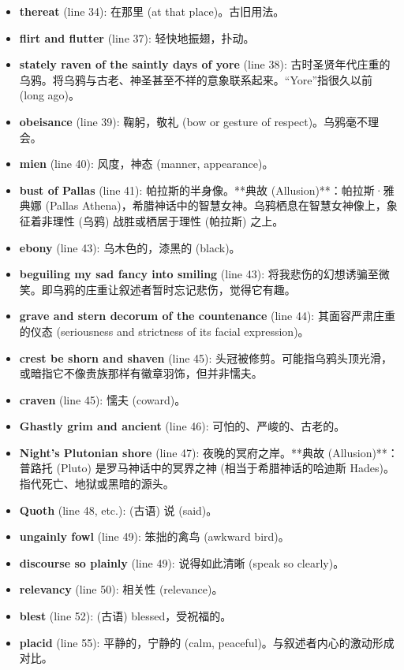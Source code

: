 \documentclass[12pt, a4paper]{article}
\begin{document}
\begin{itemize}
    \item \textbf{thereat} (line 34): 在那里 (at that place)。古旧用法。
    \item \textbf{flirt and flutter} (line 37): 轻快地振翅，扑动。
    \item \textbf{stately raven of the saintly days of yore} (line 38): 古时圣贤年代庄重的乌鸦。将乌鸦与古老、神圣甚至不祥的意象联系起来。“Yore”指很久以前 (long ago)。
    \item \textbf{obeisance} (line 39): 鞠躬，敬礼 (bow or gesture of respect)。乌鸦毫不理会。
    \item \textbf{mien} (line 40): 风度，神态 (manner, appearance)。
    \item \textbf{bust of Pallas} (line 41): 帕拉斯的半身像。**典故 (Allusion)**：帕拉斯·雅典娜 (Pallas Athena)，希腊神话中的智慧女神。乌鸦栖息在智慧女神像上，象征着非理性 (乌鸦) 战胜或栖居于理性 (帕拉斯) 之上。
    \item \textbf{ebony} (line 43): 乌木色的，漆黑的 (black)。
    \item \textbf{beguiling my sad fancy into smiling} (line 43): 将我悲伤的幻想诱骗至微笑。即乌鸦的庄重让叙述者暂时忘记悲伤，觉得它有趣。
    \item \textbf{grave and stern decorum of the countenance} (line 44): 其面容严肃庄重的仪态 (seriousness and strictness of its facial expression)。
    \item \textbf{crest be shorn and shaven} (line 45): 头冠被修剪。可能指乌鸦头顶光滑，或暗指它不像贵族那样有徽章羽饰，但并非懦夫。
    \item \textbf{craven} (line 45): 懦夫 (coward)。
    \item \textbf{Ghastly grim and ancient} (line 46): 可怕的、严峻的、古老的。
    \item \textbf{Night's Plutonian shore} (line 47): 夜晚的冥府之岸。**典故 (Allusion)**：普路托 (Pluto) 是罗马神话中的冥界之神 (相当于希腊神话的哈迪斯 Hades)。指代死亡、地狱或黑暗的源头。
    \item \textbf{Quoth} (line 48, etc.): (古语) 说 (said)。
    \item \textbf{ungainly fowl} (line 49): 笨拙的禽鸟 (awkward bird)。
    \item \textbf{discourse so plainly} (line 49): 说得如此清晰 (speak so clearly)。
    \item \textbf{relevancy} (line 50): 相关性 (relevance)。
    \item \textbf{blest} (line 52): (古语) blessed，受祝福的。
    \item \textbf{placid} (line 55): 平静的，宁静的 (calm, peaceful)。与叙述者内心的激动形成对比。

\end{itemize}
\end{document}
